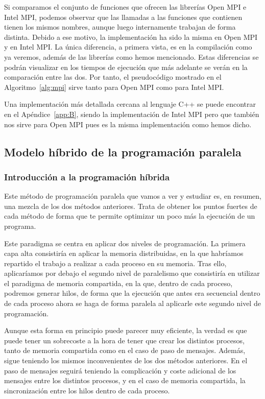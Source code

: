 \documentclass[a4paper,12pt]{article}
\begin{document}
Si comparamos el conjunto de funciones que ofrecen las librerías Open MPI e Intel MPI, podemos observar que las llamadas a las funciones que contienen tienen los mismos nombres, aunque luego internamente trabajan de forma distinta. Debido a ese motivo, la implementación ha sido la misma en Open MPI y en Intel MPI. La única diferencia, a primera vista, es en la compilación como ya veremos, además de las librerías como hemos mencionado. Estas diferencias se podrán visualizar en los tiempos de ejecución que más adelante se verán en la comparación entre las dos. Por tanto, el pseudocódigo mostrado en el Algoritmo~\ref{alg:mpi} sirve tanto para Open MPI como para Intel MPI.

Una implementación más detallada cercana al lenguaje C++ se puede encontrar en el Apéndice~\ref{app:B}, siendo la implementación de Intel MPI pero que también nos sirve para Open MPI pues es la misma implementación como hemos dicho.

\subsection{Modelo híbrido de la programación paralela}
\subsubsection{Introducción a la programación híbrida}
Este método de programación paralela que vamos a ver y estudiar es, en resumen, una mezcla de los dos métodos anteriores. Trata de obtener los puntos fuertes de cada método de forma que te permite optimizar un poco más la ejecución de un programa.


Este paradigma se centra en aplicar dos niveles de programación. La primera capa alta consistiría en aplicar la memoria distribuidas, en la que habríamos repartido el trabajo a realizar a cada proceso en su memoria. Tras ello, aplicaríamos por debajo el segundo nivel de paralelismo que consistiría en utilizar el paradigma de memoria compartida, en la que, dentro de cada proceso, podremos generar hilos, de forma que la ejecución que antes era secuencial dentro de cada proceso ahora se haga de forma paralela al aplicarle este segundo nivel de programación.

Aunque esta forma en principio puede parecer muy eficiente, la verdad es que puede tener un sobrecoste a la hora de tener que crear los distintos procesos, tanto de memoria compartida como en el caso de paso de mensajes. Además, sigue teniendo los mismos inconvenientes de los dos métodos anteriores. En el paso de mensajes seguirá teniendo la complicación y coste adicional de los mensajes entre los distintos procesos, y en el caso de memoria compartida, la sincronización entre los hilos dentro de cada proceso.
\end{document}
